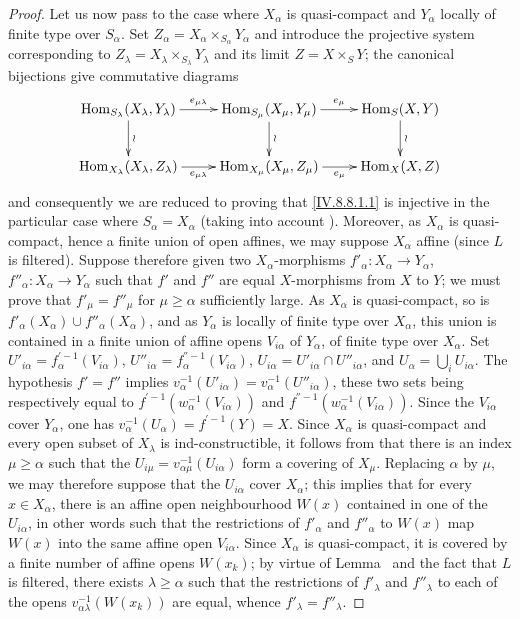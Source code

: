 \begin{proof}
Let us now pass to the case where $X_\alpha$ is quasi-compact and $Y_\alpha$ locally of finite type over $S_\alpha$.
Set $Z_\alpha=X_\alpha\times_{S_\alpha}Y_\alpha$ and introduce the projective system corresponding to $Z_\lambda=X_\lambda\times_{S_\lambda}Y_\lambda$ and its limit $Z=X\times_S Y$; the canonical bijections  give commutative diagrams
\[
\xymatrix{
  \operatorname{Hom}_{S_\lambda}(X_\lambda,Y_\lambda) \ar[r]^-{e_{\mu\lambda}} \ar[d]^{\wr} & \operatorname{Hom}_{S_\mu}(X_\mu,Y_\mu) \ar[r]^-{e_\mu} \ar[d]^{\wr} & \operatorname{Hom}_S(X,Y) \ar[d]^{\wr}\\
  \operatorname{Hom}_{X_\lambda}(X_\lambda,Z_\lambda) \ar[r]_-{e_{\mu\lambda}} & \operatorname{Hom}_{X_\mu}(X_\mu,Z_\mu) \ar[r]_-{e_\mu} & \operatorname{Hom}_X(X,Z)
}
\]
and consequently we are reduced to proving that \eqref{IV.8.8.1.1} is injective in the particular case where $S_\alpha=X_\alpha$ (taking into account ).
Moreover, as $X_\alpha$ is quasi-compact, hence a finite union of open affines, we may suppose $X_\alpha$ affine (since $L$ is filtered). Suppose therefore given two $X_\alpha$-morphisms $f'_\alpha:X_\alpha\to Y_\alpha$, $f''_\alpha:X_\alpha\to Y_\alpha$ such that $f'$ and $f''$ are equal $X$-morphisms from $X$ to $Y$; we must prove that $f'_\mu=f''_\mu$ for $\mu\geqslant\alpha$ sufficiently large. As $X_\alpha$ is quasi-compact, so is $f'_\alpha(X_\alpha)\cup f''_\alpha(X_\alpha)$, and as $Y_\alpha$ is locally of finite type over $X_\alpha$, this union is contained in a finite union of affine opens $V_{i\alpha}$ of $Y_\alpha$, of finite type over $X_\alpha$. Set $U'_{i\alpha}=f_\alpha^{'-1}(V_{i\alpha})$, $U''_{i\alpha}=f_\alpha^{''-1}(V_{i\alpha})$, $U_{i\alpha}=U'_{i\alpha}\cap U''_{i\alpha}$, and $U_\alpha=\bigcup_iU_{i\alpha}$. The hypothesis $f'=f''$ implies $v_\alpha^{-1}(U'_{i\alpha})=v_\alpha^{-1}(U''_{i\alpha})$, these two sets being respectively equal to $f^{'-1}(w_\alpha^{-1}(V_{i\alpha}))$ and $f^{''-1}(w_\alpha^{-1}(V_{i\alpha}))$. Since the $V_{i\alpha}$ cover $Y_\alpha$, one has $v_\alpha^{-1}(U_\alpha)=f^{'-1}(Y)=X$. Since $X_\alpha$ is quasi-compact and every open subset of $X_\lambda$ is ind-constructible, it follows from  that there is an index $\mu\geqslant\alpha$ such that the $U_{i\mu}=v_{\alpha\mu}^{-1}(U_{i\alpha})$ form a covering of $X_\mu$. Replacing $\alpha$ by $\mu$, we may therefore suppose that the $U_{i\alpha}$ cover $X_\alpha$; this implies that for every $x\in X_\alpha$, there is an affine open neighbourhood $W(x)$ contained in one of the $U_{i\alpha}$, in other words such that the restrictions of $f'_\alpha$ and $f''_\alpha$ to $W(x)$ map $W(x)$ into the same affine open $V_{i\alpha}$. Since $X_\alpha$ is quasi-compact, it is covered by a finite number of affine opens $W(x_k)$; by virtue of Lemma~ and the fact that $L$ is filtered, there exists $\lambda\geqslant\alpha$ such that the restrictions of $f'_\lambda$ and $f''_\lambda$ to each of the opens $v_{\alpha\lambda}^{-1}(W(x_k))$ are equal, whence $f'_\lambda=f''_\lambda$.


\end{proof}
